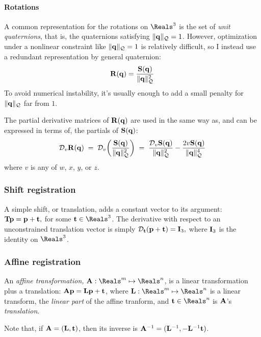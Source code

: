 \paragraph{Rotations}
\label{sec:Rotations}

A common representation for the rotations on $\Reals^3$
is the set of {\it unit quaternions},
that is, the quaternions satisfying $\| {\mathbf q} \|_{\mathcal{Q}} = 1$.
However, optimization under a nonlinear constraint
like $\| {\mathbf q} \|_{\mathcal{Q}} = 1$ is relatively difficult,
so I instead use a redundant representation by general quaternion:
\begin{equation}
{\mathbf R}({\mathbf q}) = {{{\mathbf S}({\mathbf q})} \over {\| {\mathbf q}\|_{\mathcal{Q}}^2}}
\end{equation}
To avoid numerical instability, it's usually enough
to add a small penalty for $\| {\mathbf q} \|_{\mathcal{Q}}$ far from $1$.

The partial derivative matrices of ${\mathbf R}({\mathbf q})$ are used in the
same way as,
and can be expressed in terms of,
the partials of ${\mathbf S}({\mathbf q})$:
\begin{equation}
{\mathcal D}_{v}{{\mathbf R}({\mathbf q})}
\; = \;
{\mathcal D}_{v}{\left(
{{{\mathbf S}({\mathbf q})} \over {\| {\mathbf q}\|_{\mathcal{Q}}^2}}
\right)}
\; = \;
{{{\mathcal D}_{v}{{\mathbf S}({\mathbf q})}} \over {\| {\mathbf q}\|_{\mathcal{Q}}^2}}
-
{{2v {\mathbf S}({\mathbf q})} \over {\| {\mathbf q}\|_{\mathcal{Q}}^4}}
\end{equation}
where $v$ is any of $w$, $x$, $y$, or $z$.

\subsubsection{Shift registration}
\label{sec:Shift-registration}

A simple shift, or translation, adds a constant vector
to its argument: ${\mathbf T} {\mathbf p} = {\mathbf p} + {\mathbf t},$
for some $\t \in \Reals^3$.
The derivative with respect to
an unconstrained translation vector
is simply
${\mathcal D}_{{\mathbf t}}{({\mathbf p} + {\mathbf t})} = {\mathbf I}_3,$
where ${\mathbf I}_3$ is the identity on $\Reals^3$.

\subsubsection{Affine registration}
\label{sec:affine-registration}

An {\it affine transformation,} $\A : \Reals^m \mapsto \Reals^n$,
is a linear transformation plus a translation:
${\mathbf A} {\mathbf p} = {\mathbf L} {\mathbf p} + {\mathbf t}$,
where $\L : \Reals^m \mapsto \Reals^n$ is a linear transform,
the {\it linear part} of the affine tranform,
and $\t \in \Reals^n$ is ${\mathbf A}$'s {\it translation}.

Note that, if ${\mathbf A} = ({\mathbf L},{\mathbf t})$, then its inverse is
${\mathbf A}^{-1} = ({\mathbf L}^{-1}, - {\mathbf L}^{-1}{\mathbf t})$.

